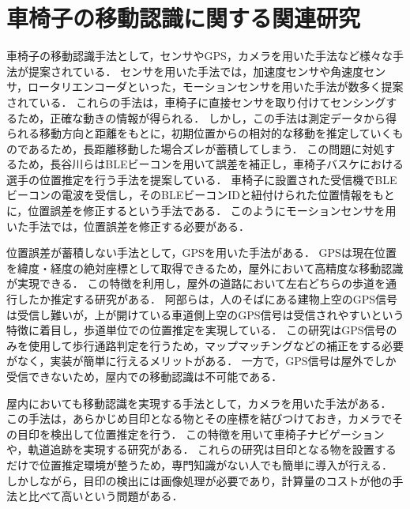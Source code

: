 \section{車椅子の移動認識に関する関連研究}
車椅子の移動認識手法として，センサやGPS，カメラを用いた手法など様々な手法が提案されている．
センサを用いた手法では，加速度センサや角速度センサ，ロータリエンコーダといった，モーションセンサを用いた手法が数多く提案されている\cite{en-Accelerometer, en-kalman}．
これらの手法は，車椅子に直接センサを取り付けてセンシングするため，正確な動きの情報が得られる．
しかし，この手法は測定データから得られる移動方向と距離をもとに，初期位置からの相対的な移動を推定していくものであるため，長距離移動した場合ズレが蓄積してしまう．
この問題に対処するため，長谷川らはBLEビーコンを用いて誤差を補正し，車椅子バスケにおける選手の位置推定を行う手法を提案している\cite{baske}．
車椅子に設置された受信機でBLEビーコンの電波を受信し，そのBLEビーコンIDと紐付けられた位置情報をもとに，位置誤差を修正するという手法である．
このようにモーションセンサを用いた手法では，位置誤差を修正する必要がある．

位置誤差が蓄積しない手法として，GPSを用いた手法がある．
GPSは現在位置を緯度・経度の絶対座標として取得できるため，屋外において高精度な移動認識が実現できる．
この特徴を利用し，屋外の道路において左右どちらの歩道を通行したか推定する研究がある．
阿部らは，人のそばにある建物上空のGPS信号は受信し難いが，上が開けている車道側上空のGPS信号は受信されやすいという特徴に着目し，歩道単位での位置推定を実現している\cite{gps}．
この研究はGPS信号のみを使用して歩行通路判定を行うため，マップマッチングなどの補正をする必要がなく，実装が簡単に行えるメリットがある．
一方で，GPS信号は屋外でしか受信できないため，屋内での移動認識は不可能である．

屋内においても移動認識を実現する手法として，カメラを用いた手法がある．
この手法は，あらかじめ目印となる物とその座標を結びつけておき，カメラでその目印を検出して位置推定を行う．
この特徴を用いて車椅子ナビゲーション\cite{marker}や，軌道追跡\cite{en-baske}を実現する研究がある．
これらの研究は目印となる物を設置するだけで位置推定環境が整うため，専門知識がない人でも簡単に導入が行える．
しかしながら，目印の検出には画像処理が必要であり，計算量のコストが他の手法と比べて高いという問題がある．

